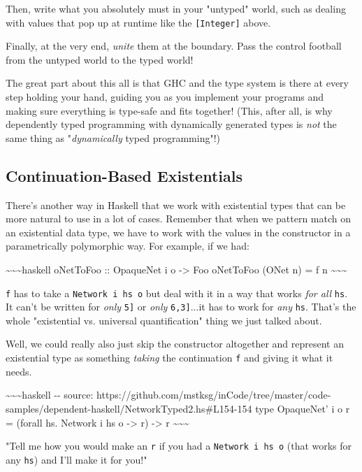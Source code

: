 \documentclass[]{article}
\begin{document}
Then, write what you absolutely must in your "untyped" world, such as dealing
with values that pop up at runtime like the \texttt{{[}Integer{]}} above.

Finally, at the very end, \emph{unite} them at the boundary. Pass the control
football from the untyped world to the typed world!

The great part about this all is that GHC and the type system is there at every
step holding your hand, guiding you as you implement your programs and making
sure everything is type-safe and fits together! (This, after all, is why
dependently typed programming with dynamically generated types is \emph{not} the
same thing as "\emph{dynamically} typed programming"!)

\subsection{Continuation-Based Existentials}

There's another way in Haskell that we work with existential types that can be
more natural to use in a lot of cases. Remember that when we pattern match on an
existential data type, we have to work with the values in the constructor in a
parametrically polymorphic way. For example, if we had:

\textasciitilde{}\textasciitilde{}\textasciitilde{}haskell oNetToFoo ::
OpaqueNet i o -\textgreater{} Foo oNetToFoo (ONet n) = f n
\textasciitilde{}\textasciitilde{}\textasciitilde{}

\texttt{f} has to take a \texttt{Network\ i\ hs\ o} but deal with it in a way
that works \emph{for all} \texttt{hs}. It can't be written for \emph{only}
\texttt{\textquotesingle{}{[}5{]}} or \emph{only}
\texttt{\textquotesingle{}{[}6,3{]}}...it has to work for \emph{any}
\texttt{hs}. That's the whole "existential vs. universal quantification" thing
we just talked about.

Well, we could really also just skip the constructor altogether and represent an
existential type as something \emph{taking} the continuation \texttt{f} and
giving it what it needs.

\textasciitilde{}\textasciitilde{}\textasciitilde{}haskell -\/- source:
https://github.com/mstksg/inCode/tree/master/code-samples/dependent-haskell/NetworkTyped2.hs\#L154-154
type OpaqueNet' i o r = (forall hs. Network i hs o -\textgreater{} r)
-\textgreater{} r \textasciitilde{}\textasciitilde{}\textasciitilde{}

"Tell me how you would make an \texttt{r} if you had a
\texttt{Network\ i\ hs\ o} (that works for any \texttt{hs}) and I'll make it for
you!"
\end{document}

